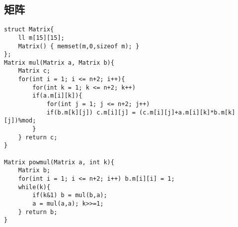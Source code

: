 \subsection{矩阵}

\begin{lstlisting}
struct Matrix{
    ll m[15][15];
    Matrix() { memset(m,0,sizeof m); }
};
Matrix mul(Matrix a, Matrix b){
    Matrix c;
    for(int i = 1; i <= n+2; i++){
        for(int k = 1; k <= n+2; k++)
        if(a.m[i][k]){
            for(int j = 1; j <= n+2; j++)
            if(b.m[k][j]) c.m[i][j] = (c.m[i][j]+a.m[i][k]*b.m[k][j])%mod;
        }
    } return c;
}

Matrix powmul(Matrix a, int k){
    Matrix b;
    for(int i = 1; i <= n+2; i++) b.m[i][i] = 1;
    while(k){
        if(k&1) b = mul(b,a);
        a = mul(a,a); k>>=1;
    } return b;
}
\end{lstlisting}



